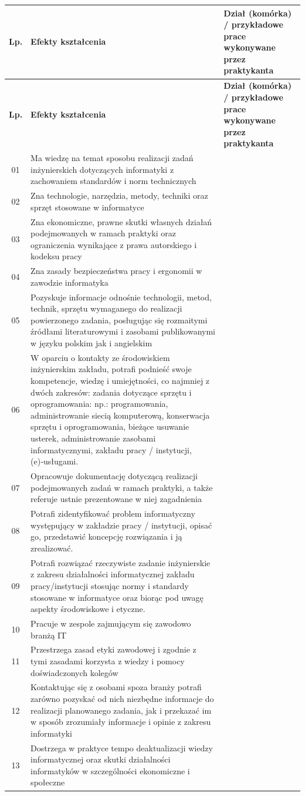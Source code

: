 \documentclass[11pt,a4paper]{article}
\begin{document}
\renewcommand{\arraystretch}{1.5}
\begin{longtable}{|c|p{8cm}|p{7cm}|}
\hline
\textbf{Lp.} & \textbf{Efekty kształcenia} & \textbf{Dział (komórka) / przykładowe prace wykonywane przez praktykanta} \\ \hline
\endfirsthead
\hline
\textbf{Lp.} & \textbf{Efekty kształcenia} & \textbf{Dział (komórka) / przykładowe prace wykonywane przez praktykanta} \\ \hline
\endhead
01 & Ma wiedzę na temat sposobu realizacji zadań inżynierskich dotyczących informatyki z zachowaniem standardów i norm technicznych & \\ \hline
02 & Zna technologie, narzędzia, metody, techniki oraz sprzęt stosowane w informatyce & \\ \hline
03 & Zna ekonomiczne, prawne skutki własnych działań podejmowanych w ramach praktyki oraz ograniczenia wynikające z prawa autorskiego i kodeksu pracy & \\ \hline
04 & Zna zasady bezpieczeństwa pracy i ergonomii w zawodzie informatyka & \\ \hline
05 & Pozyskuje informacje odnośnie technologii, metod, technik, sprzętu wymaganego do realizacji powierzonego zadania, posługując się rozmaitymi źródłami literaturowymi i zasobami publikowanymi w języku polskim jak i angielskim & \\ \hline
06 & W oparciu o kontakty ze środowiskiem inżynierskim zakładu, potrafi podnieść swoje kompetencje, wiedzę i umiejętności, co najmniej z dwóch zakresów: zadania dotyczące sprzętu i oprogramowania: np.: programowania, administrowanie siecią komputerową, konserwacja sprzętu i oprogramowania, bieżące usuwanie usterek, administrowanie zasobami informatycznymi, zakładu pracy / instytucji, (e)‑usługami. & \\ \hline
07 & Opracowuje dokumentację dotyczącą realizacji podejmowanych zadań w ramach praktyki, a także referuje ustnie prezentowane w niej zagadnienia & \\ \hline
08 & Potrafi zidentyfikować problem informatyczny występujący w zakładzie pracy / instytucji, opisać go, przedstawić koncepcję rozwiązania i ją zrealizować. & \\ \hline
09 & Potrafi rozwiązać rzeczywiste zadanie inżynierskie z zakresu działalności informatycznej zakładu pracy/instytucji stosując normy i standardy stosowane w informatyce oraz biorąc pod uwagę aspekty środowiskowe i etyczne. & \\ \hline
10 & Pracuje w zespole zajmującym się zawodowo branżą IT & \\ \hline
11 & Przestrzega zasad etyki zawodowej i zgodnie z tymi zasadami korzysta z wiedzy i pomocy doświadczonych kolegów & \\ \hline
12 & Kontaktując się z osobami spoza branży potrafi zarówno pozyskać od nich niezbędne informacje do realizacji planowanego zadania, jak i przekazać im w sposób zrozumiały informacje i opinie z zakresu informatyki & \\ \hline
13 & Dostrzega w praktyce tempo deaktualizacji wiedzy informatycznej oraz skutki działalności informatyków w szczególności ekonomiczne i społeczne & \\ \hline
\end{longtable}
\end{document}
